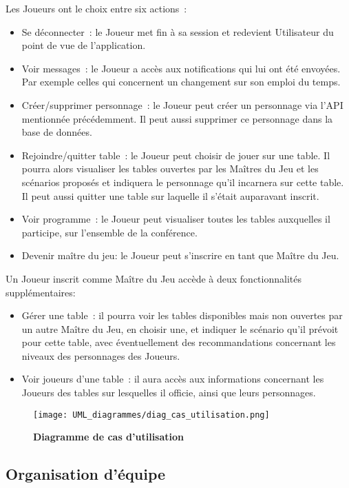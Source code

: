 \documentclass[11pt]{article}
\begin{document}
Les Joueurs ont le choix entre six actions~:
\begin{itemize}
    \item {Se déconnecter~: le Joueur met fin à sa session et redevient Utilisateur du point de vue de l'application.}
    \item{Voir messages~: le Joueur a accès aux notifications qui lui ont été envoyées. Par exemple celles qui concernent un changement sur son emploi du temps.}
    \item{Créer/supprimer personnage~: le Joueur peut créer un personnage via l'API mentionnée précédemment. Il peut aussi supprimer ce personnage dans la base de données.}
    \item{Rejoindre/quitter table~: le Joueur peut choisir de jouer sur une table. Il pourra alors visualiser les tables ouvertes par les Maîtres du Jeu et les scénarios proposés et indiquera le personnage qu'il incarnera sur cette table. Il peut aussi quitter une table sur laquelle il s'était auparavant inscrit.}
    \item{Voir programme~: le Joueur peut visualiser toutes les tables auxquelles il participe, sur l'ensemble de la conférence.}
    \item{Devenir maître du jeu: le Joueur peut s'inscrire en tant que Maître du Jeu.\\}
\end{itemize}

Un Joueur inscrit comme Maître du Jeu accède à deux fonctionnalités supplémentaires:
\begin{itemize}
    \item{Gérer une table~: il pourra voir les tables disponibles mais non ouvertes par un autre Maître du Jeu, en choisir une, et indiquer le scénario qu'il prévoit pour cette table, avec éventuellement des recommandations concernant les niveaux des personnages des Joueurs.}
    \item{Voir joueurs d'une table~: il aura accès aux informations concernant les Joueurs des tables sur lesquelles il officie, ainsi que leurs personnages.\\}
\end{itemize}

\begin{figure}[H]
    \caption{\textbf{Diagramme de cas d'utilisation}}
    \label{UML_classe_pipeline}
    \centering
    \texttt{[image: UML\_diagrammes/diag\_cas\_utilisation.png]}
\end{figure}


\subsection{Organisation d'équipe}
\end{document}
